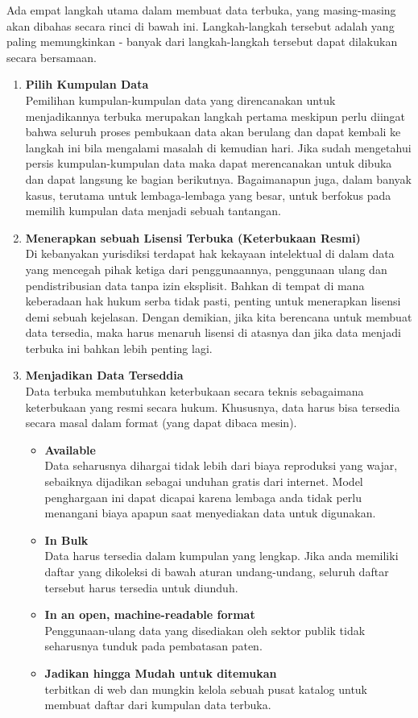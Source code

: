 Ada empat langkah utama dalam membuat data terbuka, yang masing-masing akan dibahas secara rinci di bawah ini. Langkah-langkah tersebut adalah yang paling memungkinkan - banyak dari langkah-langkah tersebut dapat dilakukan secara bersamaan. 
\begin{enumerate}
\item \textbf{Pilih Kumpulan Data} \\
Pemilihan kumpulan-kumpulan data yang direncanakan untuk menjadikannya terbuka merupakan langkah pertama meskipun perlu diingat bahwa seluruh proses pembukaan data akan berulang dan dapat kembali ke langkah ini bila mengalami masalah di kemudian hari. Jika sudah mengetahui persis kumpulan-kumpulan data maka dapat merencanakan untuk dibuka dan dapat langsung ke bagian berikutnya. Bagaimanapun juga, dalam banyak kasus, terutama untuk lembaga-lembaga yang besar, untuk berfokus pada memilih kumpulan data menjadi sebuah tantangan. 
\item \textbf{Menerapkan sebuah Lisensi Terbuka (Keterbukaan Resmi)} \\
Di kebanyakan yurisdiksi terdapat hak kekayaan intelektual di dalam data yang mencegah pihak ketiga dari penggunaannya, penggunaan ulang dan pendistribusian data tanpa izin eksplisit. Bahkan di tempat di mana keberadaan hak hukum serba tidak pasti, penting untuk menerapkan lisensi demi sebuah kejelasan. Dengan demikian, jika kita berencana untuk membuat data tersedia, maka harus menaruh lisensi di atasnya dan jika data menjadi terbuka ini bahkan lebih penting lagi. 
\item \textbf{Menjadikan Data Terseddia}\\
Data terbuka membutuhkan keterbukaan secara teknis sebagaimana keterbukaan yang resmi secara hukum. Khususnya, data harus bisa tersedia secara masal dalam format (yang dapat dibaca mesin).
\begin{itemize}
\item \textbf{Available} \\
Data seharusnya dihargai tidak lebih dari biaya reproduksi yang wajar, sebaiknya dijadikan sebagai unduhan gratis dari internet. Model penghargaan ini dapat dicapai karena lembaga anda tidak perlu menangani biaya apapun saat menyediakan data untuk digunakan.
\item \textbf{In Bulk}\\
Data harus tersedia dalam kumpulan yang lengkap. Jika anda memiliki daftar yang dikoleksi di bawah aturan undang-undang, seluruh daftar tersebut harus tersedia untuk diunduh.
\item \textbf{In an open, machine-readable format}\\
Penggunaan-ulang data yang disediakan oleh sektor publik tidak seharusnya tunduk pada pembatasan paten. 
\item \textbf{Jadikan hingga Mudah untuk ditemukan} \\
terbitkan di web dan mungkin kelola sebuah pusat katalog untuk membuat daftar dari kumpulan data terbuka.
\end{itemize}
\end{enumerate}

